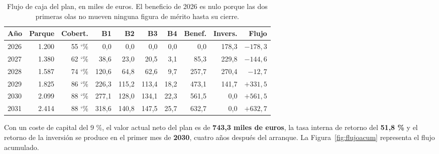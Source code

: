 \documentclass[11pt,letterpaper]{article}
\newcommand{\pct}{\char`\%}  %
\begin{document}
\begin{table}[htbp]
  \centering
  \footnotesize
  \setlength{\tabcolsep}{4.5pt}
  \caption{Flujo de caja del plan, en miles de euros. El beneficio de 2026 es
  nulo porque las dos primeras olas no mueven ninguna figura de mérito hasta
  su cierre.}
  \label{tab:flujos}
  \begin{tabular}{@{}lrrrrrrrrr@{}}
    \toprule
    \textbf{Año} & \textbf{Parque} & \textbf{Cobert.} & \textbf{B1} &
      \textbf{B2} & \textbf{B3} & \textbf{B4} & \textbf{Benef.} &
      \textbf{Invers.} & \textbf{Flujo} \\
    \midrule
    2026 & 1.200 & 55 \pct &   0{,}0 &   0{,}0 &   0{,}0 &  0{,}0 &   0{,}0 & 178{,}3 & $-178{,}3$ \\
    2027 & 1.380 & 62 \pct &  38{,}6 &  23{,}0 &  20{,}5 &  3{,}1 &  85{,}3 & 229{,}8 & $-144{,}6$ \\
    2028 & 1.587 & 74 \pct & 120{,}6 &  64{,}8 &  62{,}6 &  9{,}7 & 257{,}7 & 270{,}4 & $-12{,}7$ \\
    2029 & 1.825 & 86 \pct & 226{,}3 & 115{,}2 & 113{,}4 & 18{,}2 & 473{,}1 & 141{,}7 & $+331{,}5$ \\
    2030 & 2.099 & 88 \pct & 277{,}1 & 128{,}0 & 134{,}1 & 22{,}3 & 561{,}5 &   0{,}0 & $+561{,}5$ \\
    2031 & 2.414 & 88 \pct & 318{,}6 & 140{,}8 & 147{,}5 & 25{,}7 & 632{,}7 &   0{,}0 & $+632{,}7$ \\
    \bottomrule
  \end{tabular}
\end{table}

Con un coste de capital del 9 \%, el valor actual neto del plan es de
\textbf{743,3 miles de euros}, la tasa interna de retorno del
\textbf{51,8 \%} y el retorno de la inversión se produce en el primer mes de
\textbf{2030}, cuatro años después del arranque. La
Figura~\ref{fig:flujoacum} representa el flujo acumulado.
\end{document}
